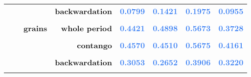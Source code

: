 \documentclass[
  authoryear,
  preprint,
  3p]{elsarticle}
\begin{document}
\begin{longtable}[t]{>{}l>{}l>{}l>{}r>{}r>{}r>{}r>{}r}
\textbf{} & \textbf{} & \textbf{} & \textbf{backwardation} & \textcolor[HTML]{4285f4}{\textbf{0.0799}} & \textcolor[HTML]{4285f4}{\textbf{0.1421}} & \textcolor[HTML]{4285f4}{\textbf{0.1975}} & \textcolor[HTML]{4285f4}{\textbf{0.0955}}\\
\textbf{\cellcolor{gray!10}{}} & \textbf{\cellcolor{gray!10}{}} & \textbf{\cellcolor{gray!10}{}} & \textbf{\cellcolor{gray!10}{contango}} & \textcolor[HTML]{4285f4}{\textbf{\cellcolor{gray!10}{0.1018}}} & \textcolor[HTML]{4285f4}{\textbf{\cellcolor{gray!10}{0.1184}}} & \textcolor[HTML]{4285f4}{\textbf{\cellcolor{gray!10}{0.2611}}} & \textcolor[HTML]{4285f4}{\textbf{\cellcolor{gray!10}{0.1186}}}\\
\textbf{} & \textbf{} & \textbf{grains} & \textbf{whole period} & \textcolor[HTML]{4285f4}{\textbf{0.4421}} & \textcolor[HTML]{4285f4}{\textbf{0.4898}} & \textcolor[HTML]{4285f4}{\textbf{0.5673}} & \textcolor[HTML]{4285f4}{\textbf{0.3728}}\\
\addlinespace
\textbf{\cellcolor{gray!10}{}} & \textbf{\cellcolor{gray!10}{}} & \textbf{\cellcolor{gray!10}{}} & \textbf{\cellcolor{gray!10}{backwardation}} & \textcolor[HTML]{4285f4}{\textbf{\cellcolor{gray!10}{0.4312}}} & \textcolor[HTML]{4285f4}{\textbf{\cellcolor{gray!10}{0.5283}}} & \textcolor[HTML]{4285f4}{\textbf{\cellcolor{gray!10}{0.5749}}} & \textcolor[HTML]{4285f4}{\textbf{\cellcolor{gray!10}{0.3289}}}\\
\textbf{} & \textbf{} & \textbf{} & \textbf{contango} & \textcolor[HTML]{4285f4}{\textbf{0.4570}} & \textcolor[HTML]{4285f4}{\textbf{0.4510}} & \textcolor[HTML]{4285f4}{\textbf{0.5675}} & \textcolor[HTML]{4285f4}{\textbf{0.4161}}\\
\textbf{\cellcolor{gray!10}{}} & \textbf{\cellcolor{gray!10}{}} & \textbf{\cellcolor{gray!10}{livestock}} & \textbf{\cellcolor{gray!10}{whole period}} & \textcolor[HTML]{4285f4}{\textbf{\cellcolor{gray!10}{0.3340}}} & \textcolor[HTML]{4285f4}{\textbf{\cellcolor{gray!10}{0.2868}}} & \textcolor[HTML]{4285f4}{\textbf{\cellcolor{gray!10}{0.3707}}} & \textcolor[HTML]{4285f4}{\textbf{\cellcolor{gray!10}{0.3333}}}\\
\textbf{} & \textbf{} & \textbf{} & \textbf{backwardation} & \textcolor[HTML]{4285f4}{\textbf{0.3053}} & \textcolor[HTML]{4285f4}{\textbf{0.2652}} & \textcolor[HTML]{4285f4}{\textbf{0.3906}} & \textcolor[HTML]{4285f4}{\textbf{0.3220}}\\
\textbf{\cellcolor{gray!10}{}} & \textbf{\cellcolor{gray!10}{}} & \textbf{\cellcolor{gray!10}{}} & \textbf{\cellcolor{gray!10}{contango}} & \textcolor[HTML]{4285f4}{\textbf{\cellcolor{gray!10}{0.3605}}} & \textcolor[HTML]{4285f4}{\textbf{\cellcolor{gray!10}{0.3150}}} & \textcolor[HTML]{4285f4}{\textbf{\cellcolor{gray!10}{0.3557}}} & \textcolor[HTML]{4285f4}{\textbf{\cellcolor{gray!10}{0.3483}}}\\

\end{longtable}
\end{document}
